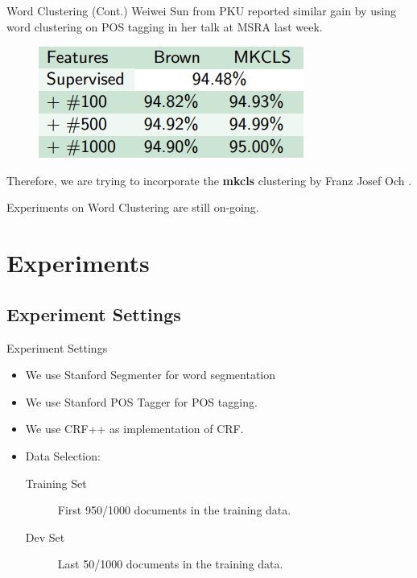 \documentclass{beamer}
\begin{document}
\begin{frame}{Word Clustering (Cont.)}
	Weiwei Sun from PKU reported similar gain by using word clustering on POS tagging \citep{sun2012capturing} in her talk at MSRA last week.
	\begin{figure}[h]
		\centering
		\includegraphics[height=0.2\textheight]{./figures/sun-cluster.png}
		\label{fig:sun-cluster}
	\end{figure}
	\pause

	Therefore, we are trying to incorporate the \textbf{mkcls} clustering by Franz Josef Och \citep{och1999efficient}.
	\pause

	Experiments on Word Clustering are still on-going.
\end{frame}

\section{Experiments} 
\subsection{Experiment Settings}
\frame{\sectionpage}

\begin{frame}{Experiment Settings}
	\begin{itemize}
		\item We use Stanford Segmenter\citep{tseng2005conditional} for word segmentation
			\pause
		\item We use Stanford POS Tagger\citep{toutanova2000enriching} for POS tagging.
			\pause
		\item We use CRF++ as implementation of CRF.
			\pause
		\item Data Selection:
			\begin{description}
				\item[Training Set] First 950/1000 documents in the training data.
				\item[Dev Set] Last 50/1000 documents in the training data.
			\end{description}
	\end{itemize}
\end{frame}
\end{document}
